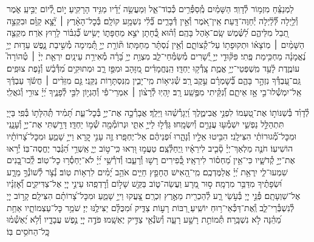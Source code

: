 \documentclass[twoside, openany, parskip=half, 11pt]{book}
\begin{document}
\begin{narrow}
לַמְנַצֵּ֗חַ מִזְמ֥וֹר לְ֯דָוִֽד׃
הַשָּׁמַ֗יִם מְֽ֯סַפְּ֯רִ֥ים כְּ֯בֽוֹד־אֵ֑ל וּֽמַעֲשֵׂ֥ה יָ֝דָ֗יו מַגִּ֥יד הָרָקִֽיעַ׃
י֣וֹם לְ֭֯יוֹם יַבִּ֣יעַֽ אֹ֑מֶר וְ֯לַ֥יְלָה לְּ֯֝לַ֗יְלָה יְ֯חַוֶּה־דָּֽעַת׃
אֵֽין־אֹ֭מֶר וְ֯אֵ֣ין דְּ֯בָרִ֑ים בְּ֯֝לִ֗י נִשְׁמָ֥ע קוֹלָֽם׃
בְּ֯כׇל־הָאָ֨רֶץ ׀ יָ֘צָ֤א קַוָּ֗ם וּבִקְצֵ֣ה תֵ֭בֵל מִלֵּיהֶ֑ם לַ֝שֶּׁ֗מֶשׁ שָֽׂם־אֹ֥הֶל בָּהֶֽם׃
וְ֯ה֗וּא כְּ֭֯חָתָן יֹצֵ֣א מֵחֻפָּת֑וֹ יָשִׂ֥ישׂ כְּ֯֝גִבּ֗וֹר לָר֥וּץ אֹֽרַח׃
מִקְצֵ֤ה הַשָּׁמַ֨יִם ׀ מֽוֹצָא֗וֹ וּתְקוּפָת֥וֹ עַל־קְ֯צוֹתָ֑ם וְ֯אֵ֥ין נִ֝סְתָּ֗ר מֵחַמָּתֽוֹ׃
תּ֘וֹרַ֤ת יְיָ֣ תְּ֭֯מִימָה מְ֯שִׁ֣יבַת נָ֑פֶשׁ עֵד֥וּת יְיָ֥ נֶ֝אֱמָנָ֗ה מַחְכִּ֥ימַת פֶּֽתִי׃
פִּקּ֘וּדֵ֤י יְיָ֣ יְ֭֯שָׁרִים מְ֯שַׂמְּ֯חֵי־לֵ֑ב מִצְוַ֥ת יְיָ֥ בָּ֝רָ֗ה מְ֯אִירַ֥ת עֵינָֽיִם׃
יִרְאַ֤ת יְיָ֨ ׀ טְ֯הוֹרָה֮ עוֹמֶ֢דֶת לָ֫עַ֥ד מִֽשְׁפְּטֵי־יְיָ֥ אֱמֶ֑ת צָֽדְ֯ק֥וּ יַחְדָּֽו׃
הַֽנֶּחֱמָדִ֗ים מִ֭זָּהָב וּמִפַּ֣ז רָ֑ב וּמְתוּקִ֥ים מִ֝דְּ֯בַ֗שׁ וְ֯נֹ֣פֶת צוּפִֽים׃
גַּֽם־עַ֭בְדְּ֯ךָ נִזְהָ֣ר בָּהֶ֑ם בְּ֯֝שׇׁמְרָ֗ם עֵ֣קֶב רָֽב׃
שְׁ֯גִיא֥וֹת מִֽי־יָבִ֑ין מִֽנִּסְתָּר֥וֹת נַקֵּֽנִי׃
גַּ֤ם מִזֵּדִ֨ים ׀ חֲשֹׂ֬ךְ עַבְדֶּ֗ךָ אַֽל־יִמְשְׁ֯לוּ־בִ֣י אָ֣ז אֵיתָ֑ם וְ֯֝נִקֵּ֗יתִי מִפֶּ֥שַֽׁע רָֽב׃
יִ֥הְיֽוּ לְ֯רָצ֨וֹן ׀ אִמְרֵי־פִ֡י וְ֯הֶגְי֣וֹן לִבִּ֣י לְ֯פָנֶ֑יךָ יְ֝יָ֗ צוּרִ֥י וְ֯גֹאֲלִֽי׃


\enlargethispage{\baselineskip}

לְ֯דָוִ֗ד
בְּ֯שַׁנּוֹת֣וֹ אֶת־טַ֭עְמוֹ לִפְנֵ֣י אֲבִימֶ֑לֶךְ וַ֝יְגָרְ֯שֵׁ֗הוּ וַיֵּלַֽךְ׃
אֲבָרְ֯כָ֣ה אֶת־יְיָ֣ בְּ֯כׇל־עֵ֑ת תָּ֝מִ֗יד תְּֽ֯הִלָּת֥וֹ בְּ֯פִֽי׃
בַּייָ֭ תִּתְהַלֵּ֣ל נַפְשִׁ֑י יִשְׁמְ֯ע֖וּ עֲנָוִ֣ים וְ֯יִשְׂמָֽחוּ׃
גַּדְּ֯ל֣וּ לַייָ֣ אִתִּ֑י וּנְרוֹמְ֯מָ֖ה שְׁ֯מ֣וֹ יַחְדָּֽו׃
דָּרַ֣שְׁתִּי אֶת־יְיָ֣ וְ֯עָנָ֑נִי וּמִכׇּל־מְ֯֝גוּרוֹתַ֗י הִצִּילָֽנִי׃
הִבִּ֣יטוּ אֵלָ֣יו וְ֯נָהָ֑רוּ וּ֝פְנֵיהֶ֗ם אַל־יֶחְפָּֽרוּ׃
זֶ֤ה עָנִ֣י קָ֭רָא וַייָ֣ שָׁמֵ֑עַ וּמִכׇּל־צָ֝רוֹתָ֗יו הוֹשִׁיעֽוֹ׃
חֹנֶ֤ה מַלְאַךְ־יְיָ֓ סָ֘בִ֤יב לִירֵאָ֗יו וַֽיְחַלְּ֯צֵֽם׃
טַעֲמ֣וּ וּ֭רְאוּ כִּֽי־ט֣וֹב יְיָ֑ אַֽשְׁרֵ֥י הַ֝גֶּ֗בֶר יֶחֱסֶה־בּֽוֹ׃
יְ֯ר֣אוּ אֶת־יְיָ֣ קְ֯דֹשָׁ֑יו כִּי־אֵ֥ין מַ֝חְס֗וֹר לִירֵאָֽיו׃
כְּ֭֯פִירִים רָשׁ֣וּ וְ֯רָעֵ֑בוּ וְ֯דֹרְ֯שֵׁ֥י יְ֝יָ֗ לֹא־יַחְסְ֯ר֥וּ כׇל־טֽוֹב׃
לְֽ֯כוּ־בָ֭נִים שִׁמְעוּ־לִ֑י יִֽרְאַ֥ת יְ֝יָ֗ אֲלַמֶּדְכֶֽם׃
מִֽי־הָ֭אִישׁ הֶחָפֵ֣ץ חַיִּ֑ים אֹהֵ֥ב יָ֝מִ֗ים לִרְא֥וֹת טֽוֹב׃
נְ֯צֹ֣ר לְ֯שׁוֹנְ֯ךָ֣ מֵרָ֑ע וּ֝שְׂפָתֶ֗יךָ מִדַּבֵּ֥ר מִרְמָֽה׃
ס֣וּר מֵ֭רָע וַעֲשֵׂה־ט֑וֹב בַּקֵּ֖שׁ שָׁל֣וֹם וְ֯רׇדְפֵֽהוּ׃
עֵינֵ֣י יְיָ֭ אֶל־צַדִּיקִ֑ים וְ֯֝אׇזְנָ֗יו אֶל־שַׁוְעָתָֽם׃
פְּ֯נֵ֣י יְיָ֭ בְּ֯עֹ֣שֵׂי רָ֑ע לְ֯הַכְרִ֖ית מֵאֶ֣רֶץ זִכְרָֽם׃
צָ֭עֲקוּ וַייָ֣ שָׁמֵ֑עַ וּמִכׇּל־צָ֝רוֹתָ֗ם הִצִּילָֽם׃
קָר֣וֹב יְיָ֭ לְ֯נִשְׁבְּ֯רֵי־לֵ֑ב וְֽ֯אֶת־דַּכְּ֯אֵי־ר֥וּחַ יוֹשִֽׁיעַ׃
רַ֭בּוֹת רָע֣וֹת צַדִּ֑יק וּ֝מִכֻּלָּ֗ם יַצִּילֶ֥נּוּ יְיָ׃
שֹׁמֵ֥ר כׇּל־עַצְמוֹתָ֑יו אַחַ֥ת מֵ֝הֵ֗נָּה לֹ֣א נִשְׁבָּֽרָה׃
תְּ֯מוֹתֵ֣ת רָשָׁ֣ע רָעָ֑ה וְ֯שֹׂנְ֯אֵ֖י צַדִּ֣יק יֶאְשָֽׁמוּ׃
פֹּדֶ֣ה יְיָ֭ נֶ֣פֶשׁ עֲבָדָ֑יו וְ֯לֹ֥א יֶ֝אְשְׁ֯מ֗וּ כׇּֽל־הַחֹסִ֥ים בּֽוֹ׃




\end{narrow}
\end{document}
